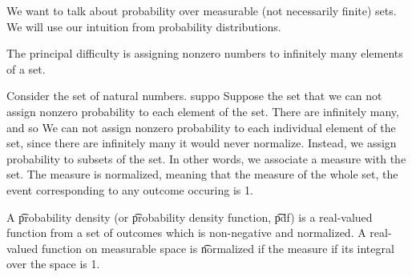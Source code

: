 

We want to talk about probability over measurable (not necessarily finite)
  sets.
We will use our intuition from probability distributions.


The principal difficulty is
assigning nonzero numbers to
infinitely many elements of
a set.

Consider the set of natural
numbers. suppo
Suppose the set
that we can not assign nonzero
probability to each element of
the set. There are infinitely
many, and so
We can not assign nonzero
probability to each individual
element of the set, since there
are infinitely many it would
never normalize.
Instead, we assign probability
to subsets of the set.
In other words, we associate
a measure with the set.
The measure is normalized, meaning
that the measure of the whole set,
the event corresponding
to any outcome occuring is 1.


A \t{probability density} (or \t{probability density function}, \t{pdf}) is a real-valued function from a set of outcomes which is non-negative and normalized.
A real-valued function on measurable space is \t{normalized} if the measure if its integral over the space is 1.

\blankpage
